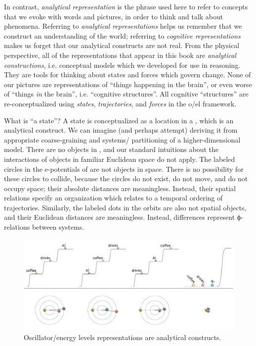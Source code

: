   In contrast, \textit{analytical representation} is the phrase used here to refer to concepts that we evoke with words and pictures, in order to think and talk about phenomena. Referring to \textit{analytical representations} helps us remember that we construct an understanding of the world; referring to \textit{cognitive representations} makes us forget that our analytical constructs are not real. From the physical perspective, all of the representations that appear in this book are \textit{analytical constructions}, i.e. conceptual models which we developed for use in reasoning. They are tools for thinking about states and forces which govern change. None of our pictures are representations of “things happening in the brain”, or even worse of “things \textit{in} the brain”, i.e. “cognitive structures”. All cognitive “structures” are re-conceptualized using \textit{states}, \textit{trajectories}, and \textit{forces} in the o/el framework. 

  What is “a state”? A state is conceptualized as a location in a , which is an analytical construct. We can imagine (and perhaps attempt) deriving it from appropriate coarse-graining and systems/ partitioning of a higher-dimensional model. There are no objects in , and our standard intuitions about the interactions of objects in familiar Euclidean space do not apply. The labeled circles in the e-potentials of {} are not objects in space. There is no possibility for these circles to collide, because the circles do not exist, do not move, and do not occupy space; their absolute distances are meaningless. Instead, their spatial relations specify an organization which relates to a temporal ordering of  trajectories. Similarly, the labeled dots in the orbits are also not spatial objects, and their Euclidean distances are meaningless. Instead,  differences represent ϕ-relations between systems.

  
\begin{figure}
\includegraphics[width=\textwidth]{figures/Tilsen-img168.png}
\caption{Oscillator/energy levels representations are analytical constructs.}
\label{fig:8:2}
\end{figure}
 

